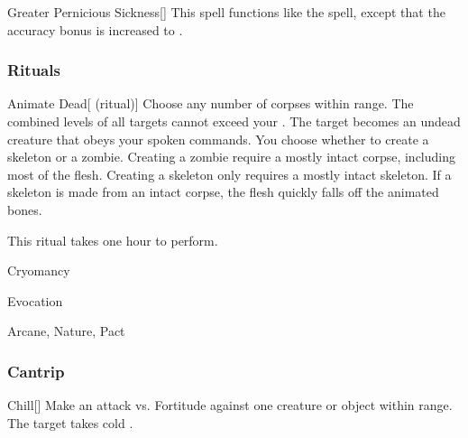 \lowercase{\hypertarget{spell:Greater Pernicious Sickness}{}}\label{spell:Greater Pernicious Sickness}
\begin{apability}[\nth{5}]{\hypertarget{spell:Greater Pernicious Sickness}{Greater Pernicious Sickness}}[]
This spell functions like the  spell, except that the accuracy bonus is increased to .
\end{apability}
\vspace{0.25em}



\subsubsection{Rituals}


\lowercase{\hypertarget{spell:Animate Dead}{}}\label{spell:Animate Dead}
\begin{attuneability}[\nth{2}]{\hypertarget{spell:Animate Dead}{Animate Dead}}[ (ritual)]
Choose any number of corpses within \rngclose range.
The combined levels of all targets cannot exceed your .
The target becomes an undead creature that obeys your spoken commands.
You choose whether to create a skeleton or a zombie.
Creating a zombie require a mostly intact corpse, including most of the flesh.
Creating a skeleton only requires a mostly intact skeleton.
If a skeleton is made from an intact corpse, the flesh quickly falls off the animated bones.

This ritual takes one hour to perform.
\end{attuneability}
\vspace{0.25em}


\newpage
\begin{spellsection}{Cryomancy}

\begin{spellheader}
\end{spellheader}


 Evocation

 Arcane, Nature, Pact

\subsubsection{Cantrip}


\begin{freeability}{Chill}[]
Make an attack vs. Fortitude against one creature or object within \rngmed range.
\hit The target takes cold .
\end{freeability}

\end{spellsection}


